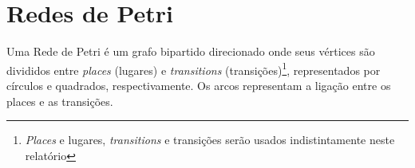 \documentclass[a4paper,10pt]{article}
\begin{document}
		
				
										
		

		
    \section{Redes de Petri}
		
		Uma Rede de Petri é um grafo bipartido direcionado onde seus vértices são divididos entre \textit{places} (lugares) e 
		\textit{transitions} (transições)\footnote{\textit{Places} e lugares, \textit{transitions} e transições serão usados indistintamente neste relatório}, 
		representados por círculos e quadrados, respectivamente. Os arcos representam a ligação 
		entre os places e as transições\cite{Liu2012}.
		
\end{document}
